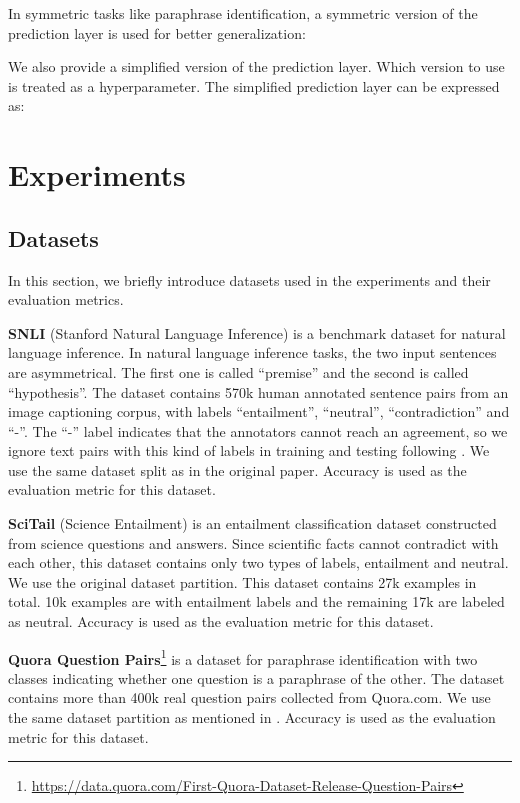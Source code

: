 \documentclass[11pt,a4paper]{article}
\begin{document}
In symmetric tasks like paraphrase identification, a symmetric version of the prediction layer is used for better generalization:


We also provide a simplified version of the prediction layer. Which version to use is treated as a hyperparameter. The simplified prediction layer can be expressed as:



\section{Experiments}
\subsection{Datasets}
In this section, we briefly introduce datasets used in the experiments and their evaluation metrics.

{\bf SNLI} \cite{snli} (Stanford Natural Language Inference) is a benchmark dataset for natural language inference. In natural language inference tasks, the two input sentences are asymmetrical. The first one is called ``premise'' and the second is called ``hypothesis''. The dataset contains 570k human annotated sentence pairs from an image captioning corpus, with labels ``entailment'', ``neutral'', ``contradiction'' and ``-''. The ``-'' label indicates that the annotators cannot reach an agreement, so we ignore text pairs with this kind of labels in training and testing following \citeauthor{snli} . We use the same dataset split as in the original paper. Accuracy is used as the evaluation metric for this dataset.

{\bf SciTail} \cite{scitail} (Science Entailment) is an entailment classification dataset constructed from science questions and answers. Since scientific facts cannot contradict with each other, this dataset contains only two types of labels, entailment and neutral. We use the original dataset partition. This dataset contains 27k examples in total. 10k examples are with entailment labels and the remaining 17k are labeled as neutral. Accuracy is used as the evaluation metric for this dataset.

{\bf Quora Question Pairs}\footnote{\url{https://data.quora.com/First-Quora-Dataset-Release-Question-Pairs}} 
is a dataset for paraphrase identification with two classes indicating whether one question is a paraphrase of the other. The dataset contains more than 400k real question pairs collected from Quora.com. We use the same dataset partition as mentioned in \citeauthor{wang2017bilateral} . Accuracy is used as the evaluation metric for this dataset.
\end{document}
